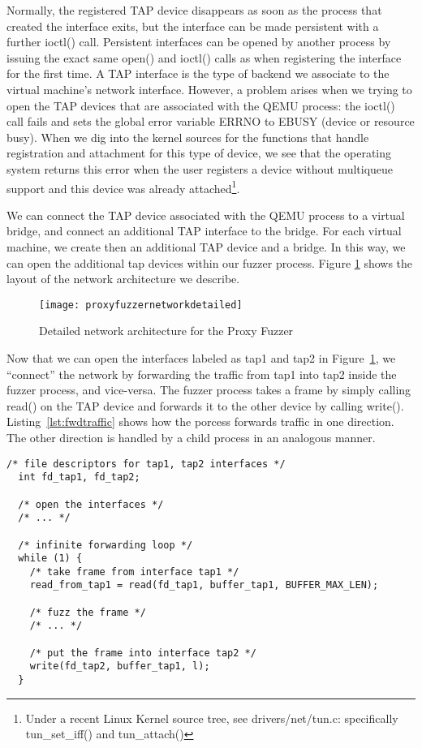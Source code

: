Normally, the registered TAP device disappears as soon as the process that created the interface exits, but
the interface can be made persistent with a further ioctl() call. Persistent interfaces can be opened
by another process by issuing the exact same open() and ioctl() calls as when registering the interface
for the first time.
A TAP interface is the type of backend we associate to the virtual machine's network interface. However, a problem arises
when we trying to open the TAP devices that are associated with the QEMU process: the ioctl() call
fails and sets the global error variable ERRNO to EBUSY (device or resource busy). When
we dig into the kernel sources for the functions that handle registration and attachment for this type of device,
we see that the operating system returns  this error when the user registers a device without multiqueue support and this device was already
attached\footnote{Under a recent Linux Kernel source tree, see drivers/net/tun.c: specifically tun\_set\_iff() and tun\_attach() }.


We can connect the TAP device associated with the QEMU process to a virtual bridge, and connect an additional TAP interface to the bridge.
For each virtual machine, we create then an additional TAP device and a bridge. In this way, we can open the additional tap devices within our fuzzer
process. Figure \ref{fig:networkdetailed} shows the layout of the network architecture we describe.

\begin{figure}[h]
  \centering
  \texttt{[image: proxyfuzzernetworkdetailed]}
  \caption[Proxy Fuzzer network architecture]{Detailed network architecture for the Proxy Fuzzer}\label{fig:networkdetailed}
\end{figure}

Now that we can open the interfaces labeled as tap1 and tap2 in Figure~\ref{fig:networkdetailed}, we ``connect'' the
network by forwarding the traffic from tap1 into tap2 inside the fuzzer process, and vice-versa. The fuzzer
process takes a frame by simply calling read() on the TAP device and forwards it to the other device by calling write().
Listing~\ref{lst:fwdtraffic} shows how the porcess forwards traffic in one direction. The other direction is handled by a
child process in an analogous manner.

\begin{lstlisting}[caption={Forwarding traffic in the Proxy Fuzzer process}, label={lst:fwdtraffic},  style=CStyle, float, floatplacement=H]
  /* file descriptors for tap1, tap2 interfaces */
  int fd_tap1, fd_tap2;

  /* open the interfaces */
  /* ... */

  /* infinite forwarding loop */
  while (1) {
    /* take frame from interface tap1 */
    read_from_tap1 = read(fd_tap1, buffer_tap1, BUFFER_MAX_LEN);

    /* fuzz the frame */
    /* ... */

    /* put the frame into interface tap2 */
    write(fd_tap2, buffer_tap1, l);
  }
\end{lstlisting}

